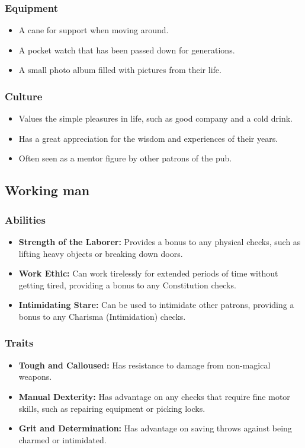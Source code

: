 \documentclass{book}
\begin{document}
\subsubsection{Equipment}
\begin{itemize}
    \item A cane for support when moving around.
    \item A pocket watch that has been passed down for generations.
    \item A small photo album filled with pictures from their life.
\end{itemize}
\subsubsection{Culture}
\begin{itemize}
    \item Values the simple pleasures in life, such as good company and a cold drink.
    \item Has a great appreciation for the wisdom and experiences of their years.
    \item Often seen as a mentor figure by other patrons of the pub.
\end{itemize}

\subsection{Working man}
\subsubsection{Abilities}
\begin{itemize}
    \item \textbf{Strength of the Laborer:} Provides a bonus to any physical checks, such as lifting heavy objects or breaking down doors.
    \item \textbf{Work Ethic:} Can work tirelessly for extended periods of time without getting tired, providing a bonus to any Constitution checks. 
    \item \textbf{Intimidating Stare:} Can be used to intimidate other patrons, providing a bonus to any Charisma (Intimidation) checks.
\end{itemize}
\subsubsection{Traits}
\begin{itemize}
    \item \textbf{Tough and Calloused:} Has resistance to damage from non-magical weapons.
    \item \textbf{Manual Dexterity:} Has advantage on any checks that require fine motor skills, such as repairing equipment or picking locks.
    \item \textbf{Grit and Determination:} Has advantage on saving throws against being charmed or intimidated.
\end{itemize}
\end{document}
